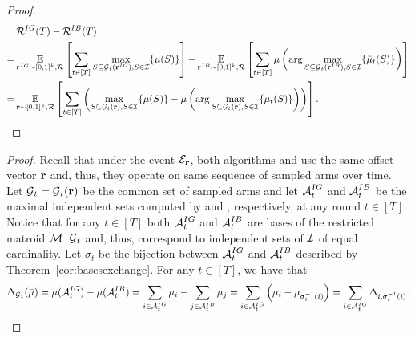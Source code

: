 \begin{proof}
\begin{align*}
&\Rew^{\IG}(T) - \Rew^{\UCB}(T) \\
= & \Ex{\off^{\IG} \sim [0,1]^k, \mathcal{R}}{\sum_{t \in [T]}\max_{S \subseteq \G_t(\off^{\IG}), S \in \I}\{\mu(S)\}} - \Ex{\off^{\UCB} \sim [0,1]^k, \mathcal{R}}{\sum_{t \in [T]}\mu\left( \arg\max_{S \subseteq \G_t(\off^{\UCB}), S \in \I}\{\bar{\mu}_t(S)\}\right)} \\
= & \Ex{\off \sim [0,1]^k, \mathcal{R}}{\sum_{t \in [T]}\left(\max_{S \subseteq \G_t(\off), S \in \I}\{\mu(S)\} - \mu\left( \arg\max_{S \subseteq \G_t(\off), S \in \I}\{\bar{\mu}_t(S)\}\right)\right)}.
\end{align*}
\end{proof}

\restateRegretSub*

\begin{proof}
Recall that under the event $\mathcal{E}_{\off}$, both algorithms \IG and \UCB use the same offset vector $\off$ and, thus, they operate on same sequence of sampled arms over time. Let $\G_t = \G_t(\off)$ be the common set of sampled arms and let $\A^{\IG}_t$ and $\A^{\UCB}_t$ be the maximal independent sets computed by \IG and \UCB, respectively, at any round $t \in [T]$. Notice that for any $t \in [T]$ both $\A^{\IG}_t$ and $\A^{\UCB}_t$ are bases of the restricted matroid $\M|\G_t$ and, thus, correspond to independent sets of $\I$ of equal cardinality. Let $\sigma_t$ be the bijection between $\A^{\IG}_t$ and $\A^{\UCB}_t$ described by Theorem~\ref{cor:basesexchange}. For any $t \in [T]$, we have that
$$
\Delta_{\G_t}(\bar\mu) =  \mu(\A^{\IG}_{t}) - \mu(\A^{\UCB}_{t}) = \sum_{i \in \A_t^{\IG}} \mu_i - \sum_{j \in \A_t^{\UCB}} \mu_j = \sum_{i \in \A^{\IG}_t} \left(\mu_i - \mu_{\sigma^{-1}_t(i)}\right) = \sum_{i \in \A^{\IG}_t} \Delta_{i , \sigma^{-1}_{t}(i)}.
$$
\end{proof}

\restateRegretTechnical*

